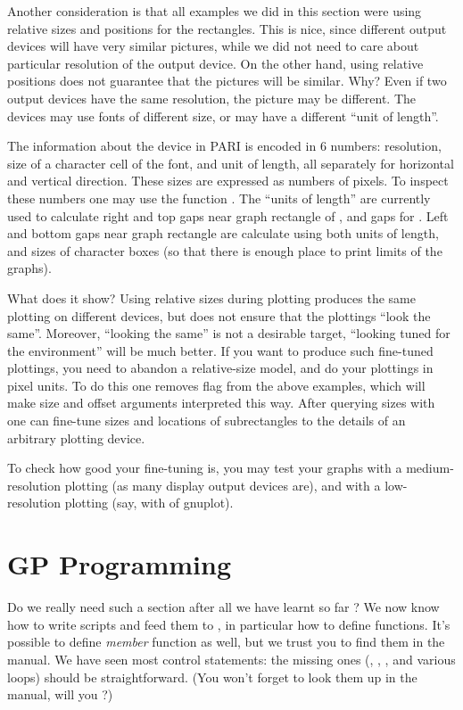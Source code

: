 Another consideration is that all examples we did in this section were
using relative sizes and positions for the rectangles.  This is nice, since
different output devices will have very similar pictures, while we
did not need to care about particular resolution of the output device.
On the other hand,
using relative positions does not guarantee that the pictures will be
similar.  Why?  Even if two output devices have the same resolution,
the picture may be different.  The devices may use fonts of different
size, or may have a different ``unit of length''.

The information about the device in PARI is encoded in 6 numbers: resolution,
size of a character cell of the font, and unit of length, all separately
for horizontal and vertical direction.  These sizes are expressed as
numbers of pixels.  To inspect these numbers one may use the function
.  The ``units of length'' are currently used to calculate
right and top gaps near graph rectangle of , and gaps for
.  Left and bottom gaps near graph rectangle are calculate
using both units of length, and sizes of character boxes (so that there
is enough place to print limits of the graphs).

What does it show?  Using relative sizes during plotting produces
 the same plotting on different devices, but does not
ensure that the plottings ``look the same''.  Moreover, ``looking the
same'' is not a desirable target, ``looking tuned for the environment''
will be much better.  If you want to produce such fine-tuned plottings,
you need to abandon a relative-size model, and do your plottings in
pixel units.  To do this one removes flag  from the above
examples, which will make size and offset arguments interpreted this way.
After querying sizes with  one can fine-tune sizes and
locations of subrectangles to the details of an arbitrary plotting
device.

To check how good your fine-tuning is, you may test your graphs with a
medium-resolution plotting (as many display output devices are), and
with a low-resolution plotting (say, with  of gnuplot).

\section{GP Programming}

Do we really need such a section after all we have learnt so far ? We now
know how to write scripts and feed them to , in particular how to
define functions. It's possible to define \emph{member} function as well, but
we trust you to find them in the manual. We have seen most control
statements: the missing ones (, , ,
 and various  loops) should be straightforward. (You
won't forget to look them up in the manual, will you ?)

